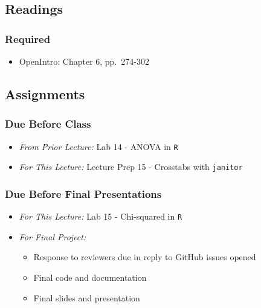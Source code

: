 \documentclass[]{book}
\providecommand{\tightlist}{%
  \setlength{\itemsep}{0pt}\setlength{\parskip}{0pt}}
\theoremstyle{definition}
\theoremstyle{definition}
\theoremstyle{definition}
\theoremstyle{remark}
\begin{document}
\hypertarget{readings-17}{%
\subsection*{Readings}\label{readings-17}}

\hypertarget{required-17}{%
\subsubsection*{Required}\label{required-17}}

\begin{itemize}
\tightlist
\item
  OpenIntro: Chapter 6, pp.~274-302
\end{itemize}

\hypertarget{assignments-17}{%
\subsection*{Assignments}\label{assignments-17}}

\hypertarget{due-before-class-15}{%
\subsubsection*{Due Before Class}\label{due-before-class-15}}

\begin{itemize}
\tightlist
\item
  \emph{From Prior Lecture:} Lab 14 - ANOVA in \texttt{R}
\item
  \emph{For This Lecture:} Lecture Prep 15 - Crosstabs with
  \texttt{janitor}
\end{itemize}

\hypertarget{due-before-final-presentations}{%
\subsubsection*{Due Before Final
Presentations}\label{due-before-final-presentations}}

\begin{itemize}
\tightlist
\item
  \emph{For This Lecture:} Lab 15 - Chi-squared in \texttt{R}
\item
  \emph{For Final Project:}

  \begin{itemize}
  \tightlist
  \item
    Response to reviewers due in reply to GitHub issues opened
  \item
    Final code and documentation
  \item
    Final slides and presentation
  \end{itemize}
\end{itemize}
\end{document}
